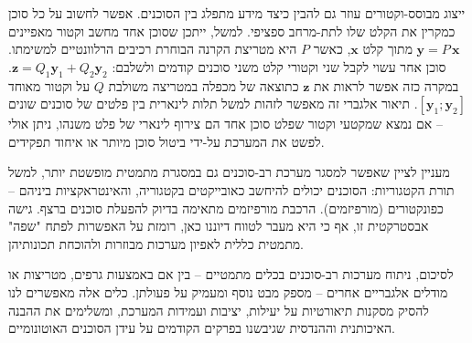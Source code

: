ייצוג מבוסס-וקטורים עוזר גם להבין כיצד מידע מתפלג בין הסוכנים. אפשר לחשוב על כל סוכן כמקרין את הקלט שלו לתת-מרחב ספציפי. למשל, ייתכן שסוכן אחד מחשב וקטור מאפיינים $\mathbf{y} = P\,\mathbf{x}$ מתוך קלט $\mathbf{x}$, כאשר $P$ היא מטריצת הקרנה הבוחרת רכיבים הרלוונטיים למשימתו. סוכן אחר עשוי לקבל שני וקטורי קלט משני סוכנים קודמים ולשלבם: $\mathbf{z} = Q_1 \mathbf{y}_1 + Q_2 \mathbf{y}_2$. במקרה כזה אפשר לראות את $\mathbf{z}$ כתוצאה של מכפלה במטריצה משולבת $Q$ על וקטור מאוחד $[\mathbf{y}_1;\mathbf{y}_2]$. תיאור אלגברי זה מאפשר לזהות למשל תלות לינארית בין פלטים של סוכנים שונים – אם נמצא שמקטעי וקטור שפלט סוכן אחד הם צירוף לינארי של פלט משנהו, ניתן אולי לפשט את המערכת על-ידי ביטול סוכן מיותר או איחוד תפקידים.

מעניין לציין שאפשר למסגר מערכת רב-סוכנים גם במסגרת מתמטית מופשטת יותר, למשל תורת הקטגוריות: הסוכנים יכולים להיחשב כאובייקטים בקטגוריה, והאינטראקציות ביניהם – כפונקטורים (מורפיזמים). הרכבת מורפיזמים מתאימה בדיוק להפעלת סוכנים ברצף. גישה אבסטרקטית זו, אף כי היא מעבר לטווח דיוננו כאן, רומזת על האפשרות לפתח "שפה" מתמטית כללית לאפיון מערכות  מבוזרות ולהוכחת תכונותיהן.

לסיכום, ניתוח מערכות רב-סוכנים בכלים מתמטיים – בין אם באמצעות גרפים, מטריצות או מודלים אלגבריים אחרים – מספק מבט נוסף ומעמיק על פעולתן. כלים אלה מאפשרים לנו להסיק מסקנות תיאורטיות על יעילות, יציבות ועמידות המערכת, ומשלימים את ההבנה האיכותנית וההנדסית שגיבשנו בפרקים הקודמים על עידן הסוכנים האוטונומיים.
